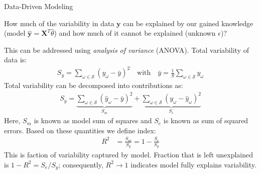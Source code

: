 \documentclass[9pt]{beamer}
\begin{document}
%
\begin{frame}{Data-Driven Modeling}

\begin{block}{}
How much of the variability in data $\mathbf{y}$ can be explained by our gained knowledge (model $\hat{\mathbf{y}}=\mathbf{X}^T\hat{\theta}$) and how much of it cannot be explained (unknown $\epsilon$)?
\end{block}
This can be addressed using {\em analysis of variance} (ANOVA).  Total variability of data is:
\begin{align*}
S_{y}=\sum_{\omega\in \mathcal{S}}(y_\omega -\bar{{y}})^2\quad \textrm{with}
\quad \bar{{y}}=\frac{1}{S}\sum_{\omega \in \mathcal{S}}y_\omega 
\end{align*}
Total variability can be decomposed into contributions as:
\begin{align*}
S_{y}=\underbrace{\sum_{\omega\in \mathcal{S}}(\hat{y}_\omega -\bar{y})^2}_{S_m}+\underbrace{\sum_{\omega\in \mathcal{S}}(y_\omega -\hat{y}_\omega)^2}_{S_e}
\end{align*}
Here, $S_m$ is known as model sum of squares and $S_e$ is known as sum of squared errors.  Based on these quantities we define index: 
\begin{align*}
R^2&=\frac{S_m}{S_y}=1-\frac{S_e}{S_y}
\end{align*}
This is faction of variability captured by model. Fraction that is left unexplained is $1-R^2={S_e}/{S_y}$; consequently, $R^2\to 1$ indicates model fully explains variability. 
\end{frame}
\end{document}
